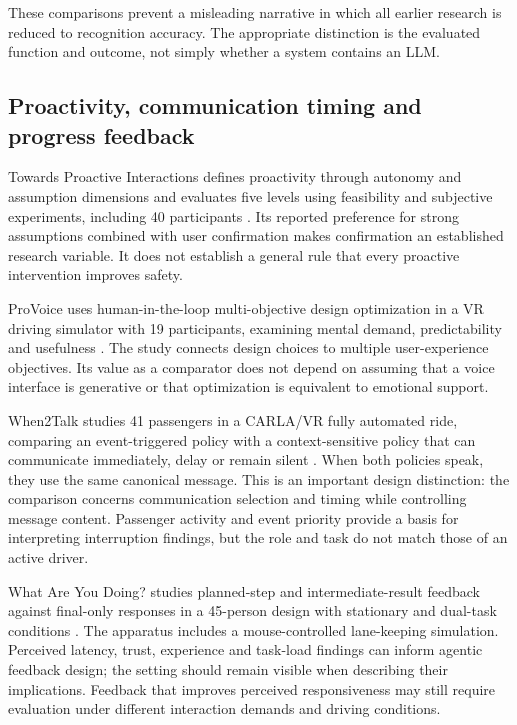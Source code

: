 \documentclass[11pt,a4paper]{article}
\begin{document}
These comparisons prevent a misleading narrative in which all earlier
research is reduced to recognition accuracy. The appropriate distinction
is the evaluated function and outcome, not simply whether a system
contains an LLM.

\subsection{Proactivity, communication timing and progress
feedback}\label{proactivity-communication-timing-and-progress-feedback}

Towards Proactive Interactions defines proactivity through autonomy and
assumption dimensions and evaluates five levels using feasibility and
subjective experiments, including 40 participants \citep{S9}. Its
reported preference for strong assumptions combined with user
confirmation makes confirmation an established research variable. It
does not establish a general rule that every proactive intervention
improves safety.

ProVoice uses human-in-the-loop multi-objective design optimization in a
VR driving simulator with 19 participants, examining mental demand,
predictability and usefulness \citep{S12}. The study connects design
choices to multiple user-experience objectives. Its value as a
comparator does not depend on assuming that a voice interface is
generative or that optimization is equivalent to emotional support.

When2Talk studies 41 passengers in a CARLA/VR fully automated ride,
comparing an event-triggered policy with a context-sensitive policy that
can communicate immediately, delay or remain silent \citep{S13}. When
both policies speak, they use the same canonical message. This is an
important design distinction: the comparison concerns communication
selection and timing while controlling message content. Passenger
activity and event priority provide a basis for interpreting
interruption findings, but the role and task do not match those of an
active driver.

What Are You Doing? studies planned-step and intermediate-result
feedback against final-only responses in a 45-person design with
stationary and dual-task conditions \citep{S10}. The apparatus includes
a mouse-controlled lane-keeping simulation. Perceived latency, trust,
experience and task-load findings can inform agentic feedback design;
the setting should remain visible when describing their implications.
Feedback that improves perceived responsiveness may still require
evaluation under different interaction demands and driving conditions.
\end{document}
